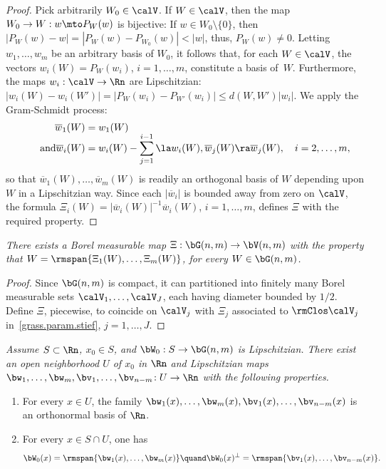 \begin{proof}
Pick arbitrarily $W_0 \in \calV$.
If $W \in \calV$, then the map $W_0 \to W: w \mto P_W(w)$ is bijective: If $w \in W_0 \setminus \{0\}$, then $\left|P_W(w)-w\right| = \left|P_W(w)-P_{W_0}(w)\right| < |w|$, thus, $P_W(w) \neq 0$.
Letting $w_1,\ldots,w_m$ be an arbitrary basis of $W_0$, it follows that, for each $W \in \calV$, the vectors $w_i(W) = P_W(w_i)$, $i=1,\ldots,m$, constitute a basis of~$W$.
Furthermore, the maps $w_i: \calV \to \Rn$ are Lipschitzian: $\left| w_i(W)-w_i(W')\right| = \left|P_W(w_i) - P_{W'}(w_i)\right| \leq d(W,W') |w_i|$.
We apply the Gram-Schmidt process:
\begin{align*}
\overline{w}_1(W) &= w_1(W)\\[-5pt]
\tag*{and} \overline{w}_i(W) &= w_i(W) - \sum_{j=1}^{i-1} \la w_i(W), \overline{w}_j(W) \ra \overline{w}_j(W),\quad i=2,\ldots,m,
\end{align*}
so that $\overline{w}_1(W),\ldots,\overline{w}_m(W)$ is readily an orthogonal basis of $W$ depending upon $W$ in a Lipschitzian way.
Since each $\left|\overline{w}_i\right|$ is bounded away from zero on $\calV$, the formula $\Xi_i(W) = \left|\overline{w}_i(W)\right|^{-1}\overline{w}_i(W)$, $i=1,\ldots,m$, defines $\Xi$ with the required property.
\end{proof}

\begin{Empty}[]
\label{grass.param.stief.borel}
{\it
There exists a Borel measurable map $\Xi: \bG(n,m) \to \bV(n,m)$ with the property that $W = \rmspan \{ \Xi_1(W),\ldots,\Xi_m(W)\}$, for every $W \in \bG(n,m)$.
}
\end{Empty}

\begin{proof}
Since $\bG(n,m)$ is compact, it can partitioned into finitely many Borel measurable sets $\calV_1,\ldots,\calV_J$, each having diameter bounded by $1/2$.
Define $\Xi$, piecewise, to coincide on $\calV_j$ with $\Xi_j$ associated to $\rmClos \calV_j$ in~\ref{grass.param.stief}, $j=1,\ldots,J$.
\end{proof}

\begin{Empty}[]
\label{orth.frame}
{\it
Assume $S \subset \Rn$, $x_0 \in S$, and $\bW_0: S \to \bG(n,m)$ is Lipschitzian. There exist an open neighborhood $U$ of $x_0$ in $\Rn$ and Lipschitzian maps $\bw_1,\ldots,\bw_m,\bv_1,\ldots,\bv_{n-m}\!: U \to \Rn$ with the following properties.
\begin{enumerate}
\item For every $x \in U$, the family $\bw_1(x),\ldots,\bw_m(x),\bv_1(x),\ldots,\bv_{n-m}(x)$ is an ortho\-normal basis of $\Rn$.
\item For every $x \in S \cap U$, one has
\begin{equation*}
\bW_0(x) = \rmspan \{ \bw_1(x),\ldots,\bw_m(x) \}
\quand
\bW_0(x)^\perp = \rmspan \{ \bv_1(x),\ldots,\bv_{n-m}(x) \}.
\end{equation*}
\end{enumerate}
}
\end{Empty}

